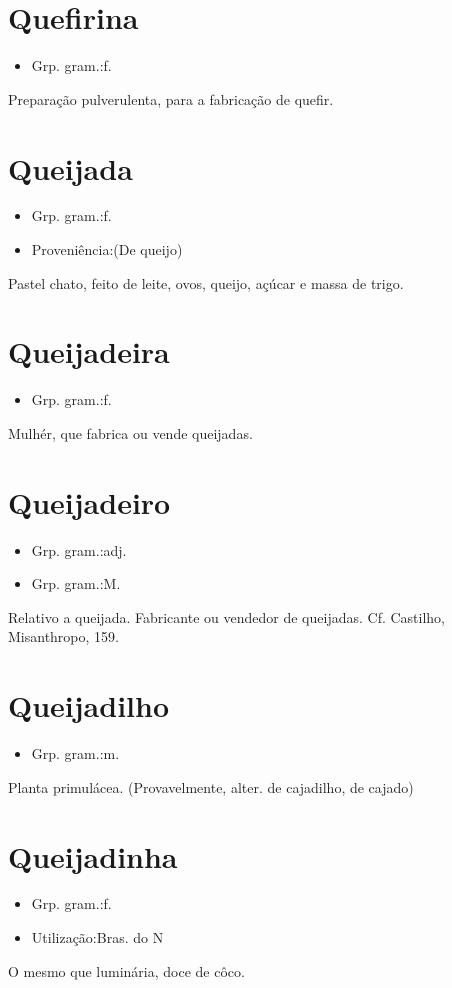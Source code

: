 \section{Quefirina}
\begin{itemize}
\item {Grp. gram.:f.}
\end{itemize}
Preparação pulverulenta, para a fabricação de quefir.
\section{Queijada}
\begin{itemize}
\item {Grp. gram.:f.}
\end{itemize}
\begin{itemize}
\item {Proveniência:(De \textunderscore queijo\textunderscore )}
\end{itemize}
Pastel chato, feito de leite, ovos, queijo, açúcar e massa de trigo.
\section{Queijadeira}
\begin{itemize}
\item {Grp. gram.:f.}
\end{itemize}
Mulhér, que fabrica ou vende queijadas.
\section{Queijadeiro}
\begin{itemize}
\item {Grp. gram.:adj.}
\end{itemize}
\begin{itemize}
\item {Grp. gram.:M.}
\end{itemize}
Relativo a queijada.
Fabricante ou vendedor de queijadas. Cf. Castilho, \textunderscore Misanthropo\textunderscore , 159.
\section{Queijadilho}
\begin{itemize}
\item {Grp. gram.:m.}
\end{itemize}
Planta primulácea.
(Provavelmente, alter. de \textunderscore cajadilho\textunderscore , de \textunderscore cajado\textunderscore )
\section{Queijadinha}
\begin{itemize}
\item {Grp. gram.:f.}
\end{itemize}
\begin{itemize}
\item {Utilização:Bras. do N}
\end{itemize}
O mesmo que \textunderscore luminária\textunderscore , doce de côco.
